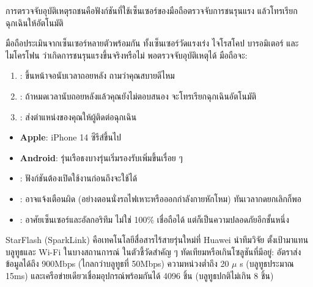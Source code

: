 
การตรวจจับอุบัติเหตุรถชนคือฟังก์ชันที่ใช้เซ็นเซอร์ของมือถือตรวจจับการชนรุนแรง แล้วโทรเรียกฉุกเฉินให้อัตโนมัติ


มือถือประเมินจากเซ็นเซอร์หลายตัวพร้อมกัน ทั้งเซ็นเซอร์วัดแรงเร่ง ไจโรสโคป บารอมิเตอร์ และไมโครโฟน ว่าเกิดการชนรุนแรงขึ้นจริงหรือไม่ พอตรวจจับอุบัติเหตุได้ มือถือจะ:

\begin{enumerate}
  \item : ขึ้นหน้าจอนับเวลาถอยหลัง ถามว่าคุณสบายดีไหม
  \item : ถ้าหมดเวลานับถอยหลังแล้วคุณยังไม่ตอบสนอง จะโทรเรียกฉุกเฉินอัตโนมัติ
  \item : ส่งตำแหน่งของคุณให้ผู้ติดต่อฉุกเฉิน
\end{enumerate}


\begin{itemize}
  \item \textbf{Apple}: iPhone 14 ซีรีส์ขึ้นไป
  \item \textbf{Android}: รุ่นเรือธงบางรุ่นเริ่มรองรับเพิ่มขึ้นเรื่อย ๆ
\end{itemize}


\begin{itemize}
  \item : ฟังก์ชันต้องเปิดใช้งานก่อนถึงจะใช้ได้
  \item : อาจแจ้งเตือนผิด (อย่างตอนนั่งรถไฟเหาะหรือออกกำลังกายหักโหม) ทันเวลากดยกเลิกก็พอ
  \item : อาศัยเซ็นเซอร์และอัลกอริทึม ไม่ใช่ 100\% เชื่อถือได้ แต่ก็เป็นความปลอดภัยอีกชั้นหนึ่ง
\end{itemize}


StarFlash (SparkLink) คือเทคโนโลยีสื่อสารไร้สายรุ่นใหม่ที่ Huawei นำทีมวิจัย ตั้งเป้ามาแทนบลูทูธและ Wi-Fi ในบางสถานการณ์ ในตัวชี้วัดสำคัญ ๆ ทัดเทียมหรือเกินโซลูชันที่มีอยู่: อัตราส่งข้อมูลได้ถึง 900Mbps (ไกลกว่าบลูทูธที่ 50Mbps) ความหน่วงต่ำถึง 20 $\mu$ s (บลูทูธประมาณ 15ms) และเครือข่ายเดียวเชื่อมอุปกรณ์พร้อมกันได้ 4096 ชิ้น (บลูทูธปกติไม่เกิน 8 ชิ้น)


